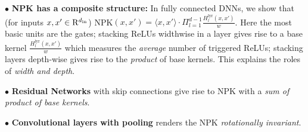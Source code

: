 $\bullet$ \textbf{NPK has a composite structure:} In fully connected DNNs, we show that (for inputs $x,x'\in\mathrm{R}^{d_{\text{in}}}$) NPK$(x,x')=\langle x,x'\rangle\cdot \Pi_{l=1}^{d-1} \frac{H^{\text{lyr}}_l(x,x')}{w}$. Here the most basic units are the gates; stacking ReLUs widthwise in a layer gives rise to a base kernel $\frac{H^{\text{lyr}}_l(x,x')}{w}$ which measures the \emph{average} number of triggered ReLUs; stacking layers depth-wise gives rise to the \emph{product} of base kernels. This explains the roles of \emph{width and depth}.

$\bullet$ \textbf{Residual Networks} with skip connections give rise to NPK with a \emph{ sum of product of base kernels}. 

$\bullet$ \textbf{Convolutional layers with pooling} renders the NPK \emph{rotationally invariant}.

